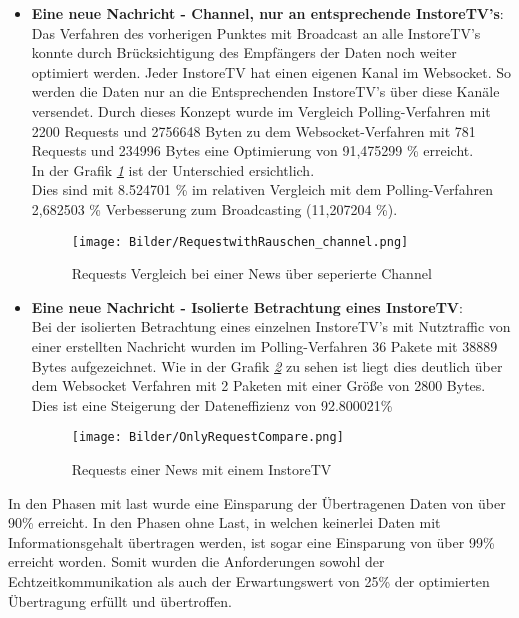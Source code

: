 \begin{itemize}
\item \textbf{Eine neue Nachricht - Channel, nur an entsprechende InstoreTV's}: \\
Das Verfahren des vorherigen Punktes mit Broadcast an alle InstoreTV's konnte durch Brücksichtigung des Empfängers der Daten noch weiter optimiert werden. Jeder InstoreTV hat einen eigenen Kanal im Websocket. So werden die Daten nur an die Entsprechenden InstoreTV's über diese Kanäle versendet. Durch dieses Konzept wurde im Vergleich Polling-Verfahren mit 2200 Requests und 2756648 Byten zu dem Websocket-Verfahren mit 781 Requests und 234996 Bytes eine Optimierung von 91,475299 \% erreicht. 
\\In der Grafik \textit{\ref{fig:RequestwithRauschen_channel} } ist der Unterschied ersichtlich.
\\Dies sind mit 8.524701 \% im relativen Vergleich mit dem Polling-Verfahren 2,682503 \% Verbesserung zum Broadcasting (11,207204 \%).

\begin{figure}[h]
 \begin{addmargin}{-0.2\linewidth}
   \centering 
   \texttt{[image: Bilder/RequestwithRauschen\_channel.png]}
 \end{addmargin} 
 \caption{Requests Vergleich bei einer News über seperierte Channel}
 \label{fig:RequestwithRauschen_channel}
\end{figure}

\item \textbf{Eine neue Nachricht - Isolierte Betrachtung eines InstoreTV}: \\
Bei der isolierten Betrachtung eines einzelnen InstoreTV's mit Nutztraffic von einer erstellten Nachricht wurden im Polling-Verfahren 36 Pakete mit 38889 Bytes aufgezeichnet. Wie in der Grafik \textit{\ref{fig:OnlyRequestCompare} } zu sehen ist liegt dies deutlich über dem  Websocket Verfahren mit 2 Paketen mit einer Größe von 2800 Bytes. Dies ist eine Steigerung der Dateneffizienz von 92.800021\%

\begin{figure}[h]
 \begin{addmargin}{-0.2\linewidth}
   \centering 
   \texttt{[image: Bilder/OnlyRequestCompare.png]}
 \end{addmargin} 
 \caption{Requests einer News mit einem InstoreTV}
 \label{fig:OnlyRequestCompare}
\end{figure}

\end{itemize} \bigskip In den Phasen mit last wurde eine Einsparung der Übertragenen Daten von über 90\% erreicht. In den Phasen ohne Last, in welchen keinerlei Daten mit Informationsgehalt übertragen werden, ist sogar eine Einsparung von über 99\% erreicht worden. Somit wurden die Anforderungen sowohl der Echtzeitkommunikation als auch der Erwartungswert von 25\% der optimierten Übertragung erfüllt und übertroffen.








